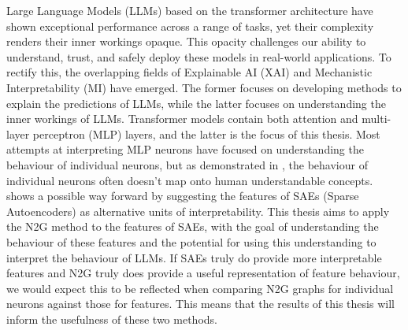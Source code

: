 \documentclass[../main.tex]{subfiles}
\begin{document}
Large Language Models (LLMs) based on the transformer architecture \citep{vaswani_attention_2023} have shown exceptional performance across a range of tasks, yet their complexity renders their inner workings opaque.
This opacity challenges our ability to understand, trust, and safely deploy these models in real-world applications.
To rectify this, the overlapping fields of Explainable AI (XAI) and Mechanistic Interpretability (MI) have emerged.
The former focuses on developing methods to explain the predictions of LLMs, while the latter focuses on understanding the inner workings of LLMs.
Transformer models contain both attention and multi-layer perceptron (MLP) layers, and the latter is the focus of this thesis.
Most attempts at interpreting MLP neurons have focused on understanding the behaviour of individual neurons, but as demonstrated in \citet{elhage_toy_2022}, the behaviour of individual neurons often doesn't map onto human understandable concepts.
\citet{bricken_towards_2023} shows a possible way forward by suggesting the features of SAEs (Sparse Autoencoders) as alternative units of interpretability.
This thesis aims to apply the N2G \citep{foote_neuron_2023} method to the features of SAEs, with the goal of understanding the behaviour of these features and the potential for using this understanding to interpret the behaviour of LLMs.
If SAEs truly do provide more interpretable features and N2G truly does provide a useful representation of feature behaviour, we would expect this to be reflected when comparing N2G graphs for individual neurons against those for features. 
This means that the results of this thesis will inform the usefulness of these two methods.

\end{document}

